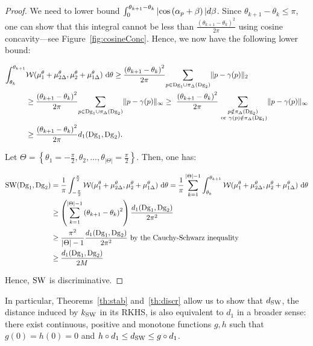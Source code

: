 \documentclass[11pt]{article}
\newcommand{\Dg}{\mathrm{Dg}}
\newcommand{\SW}{{\rm SW}}
\begin{document}
\begin{proof}
We need to lower bound $\int_0^{\theta_{k+1}-\theta_k}|{\rm cos}\left(\alpha_p+\beta\right)|d\beta$.
Since $\theta_{k+1}-\theta_k\leq\pi$, one can show that this integral cannot be less than $\frac{\left(\theta_{k+1}-\theta_k\right)^2}{2\pi}$ 
using cosine concavity---see Figure~\ref{fig:cosineConc}. 
Hence, we now have the following lower bound:
 
\begin{align}
\int_{\theta_k}^{\theta_{k+1}} &\mathcal W(\mu_1^\theta+\mu_{2\Delta}^\theta,\mu_2^\theta+\mu_{1\Delta}^\theta)\ {\rm d}\theta
\geq \frac{\left(\theta_{k+1}-\theta_k\right)^2}{2\pi}\underset{p\in \Dg_1\cup\pi_\Delta(\Dg_2)}{\sum}\|p-\gamma(p)\|_2\nonumber\\
&\geq \frac{\left(\theta_{k+1}-\theta_k\right)^2}{2\pi}\underset{p\in \Dg_1\cup\pi_\Delta(\Dg_2)}{\sum}\|p-\gamma(p)\|_\infty\geq\
\frac{\left(\theta_{k+1}-\theta_k\right)^2}{2\pi}\underset{\substack{ p\notin \pi_\Delta(\Dg_2) \\ {\rm\ or\ }\gamma(p)\notin\pi_\Delta(\Dg_1)} }{\sum}\|p-\gamma(p)\|_\infty\nonumber\\
&\geq \frac{\left(\theta_{k+1}-\theta_k\right)^2}{2\pi}d_1(\Dg_1,\Dg_2).
\nonumber
\end{align}

Let $\Theta=\left\{\theta_1=-\frac{\pi}{2},\theta_2,...,\theta_{|\Theta|}=\frac{\pi}{2}\right\}$. Then, one has:

\begin{align*}
\SW(\Dg_1,\Dg_2) & =\frac{1}{\pi}\int_{-\frac{\pi}{2}}^{\frac{\pi}{2}} \mathcal W(\mu_1^\theta+\mu_{2\Delta}^\theta,\mu_2^\theta+\mu_{1\Delta}^\theta)\ {\rm d}\theta
=\frac{1}{\pi}\sum_{k=1}^{|\Theta|-1}\int_{\theta_k}^{\theta_{k+1}} \mathcal W(\mu_1^\theta+\mu_{2\Delta}^\theta,\mu_2^\theta+\mu_{1\Delta}^\theta)\ 	{\rm d}\theta\nonumber\\
&\geq \left(\sum_{k=1}^{|\Theta|-1}\left(\theta_{k+1}-\theta_k\right)^2\right)\frac{d_1(\Dg_1,\Dg_2)}{2\pi^2} \nonumber\\
&\geq \frac{\pi^2}{|\Theta|-1}\frac{d_1(\Dg_1,\Dg_2)}{2\pi^2}\text{ by the Cauchy-Schwarz inequality} \nonumber\\
&\geq \frac{d_1(\Dg_1,\Dg_2)}{2M}
\end{align*}

Hence, $\SW$ is discriminative.
\end{proof}

In particular, Theorems~\ref{th:stab} and~\ref{th:discr} allow us to show that $d_{\rm SW}$, the distance induced by $k_{\rm SW}$ in its RKHS,
is also equivalent to $d_1$ in a broader sense: there exist continuous, positive and monotone functions $g,h$ such that $g(0)=h(0)=0$
and $h\circ d_1\leq d_{\rm SW}\leq g\circ d_1$. \\
 
\end{document}
